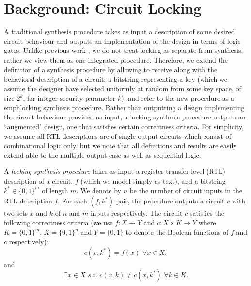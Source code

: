 \section{Background: Circuit Locking}
A traditional synthesis procedure takes as input a description of some desired circuit behaviour and outputs an implementation of the design in terms of logic gates. Unlike previous work \cite{}, we do not treat locking as separate from synthesis; rather we view them as one integrated procedure. Therefore, we extend the definition of a synthesis procedure by allowing to receive along with the behavioral description of a circuit; a bitstring representing a key (which we assume the designer have selected uniformly at random from some key space, of size $2^k$, for integer security parameter $k$), and refer to the new procedure as a \\emph{locking synthesis procedure}. Rather than outputting a design implementing the circuit behaviour provided as input, a locking synthesis procedure outputs an ``augmented" design, one that satisfies certain correctness criteria. For simplicity, we assume all RTL descriptions are of single-output circuits which consist of combinational logic only, but we note that all definitions and results are easily extend-able to the multiple-output case as well as sequential logic.

\begin{definition}
A \emph{locking synthesis procedure} takes as input a register-transfer level (RTL) description of a circuit, $f$ (which we model simply as text), and a bitstring $k^{*} \in \{0,1\}^{m}$ of length $m$. We denote by $n$ be the number of circuit inputs in the RTL description $f$. For each $(f,k^*)$-pair, the procedure outputs a circuit $c$ with two sets $x$ and $k$ of $n$ and $m$ inputs respectively. The circuit $c$  satisfies the following correctness criteria (we use $f: X \rightarrow Y$ and $c: X \times K \rightarrow Y$ where $K = \{0,1\}^{m}$, $X = \{0,1\}^{n}$ and $Y = \{0,1\}$ to denote the Boolean functions of $f$ and $c$ respectively):
$$ c(x,k^{*}) = f(x) \, \, \forall x \in X, $$
and 
$$ \exists  x \in X \,\, s.t. \,\, c(x,k) \neq c(x,k^{*}) \, \, \forall k \in K.$$ 
\end{definition}



